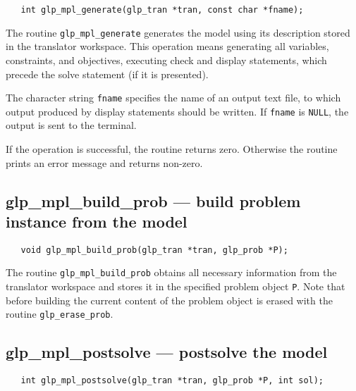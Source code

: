 \synopsis

\begin{verbatim}
   int glp_mpl_generate(glp_tran *tran, const char *fname);
\end{verbatim}

\description

The routine \verb|glp_mpl_generate| generates the model using its
description stored in the translator workspace. This operation means
generating all variables, constraints, and objectives, executing check
and display statements, which precede the solve statement (if it is
presented).

The character string \verb|fname| specifies the name of an output text
file, to which output produced by display statements should be written.
If \verb|fname| is \verb|NULL|, the output is sent to the terminal.

\returns

If the operation is successful, the routine returns zero. Otherwise
the routine prints an error message and returns non-zero.

\vspace*{-6pt}

\subsection{glp\_mpl\_build\_prob --- build problem instance from the
model}

\synopsis

\begin{verbatim}
   void glp_mpl_build_prob(glp_tran *tran, glp_prob *P);
\end{verbatim}

\description

The routine \verb|glp_mpl_build_prob| obtains all necessary information
from the translator work\-space and stores it in the specified problem
object \verb|P|. Note that before building the current content of the
problem object is erased with the routine \verb|glp_erase_prob|.

\vspace*{-6pt}

\subsection{glp\_mpl\_postsolve --- postsolve the model}

\synopsis

\begin{verbatim}
   int glp_mpl_postsolve(glp_tran *tran, glp_prob *P, int sol);
\end{verbatim}


